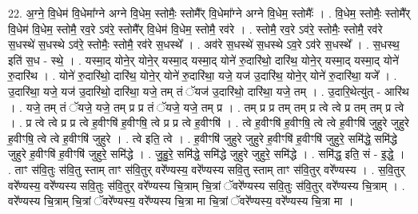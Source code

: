 \documentclass[17pt]{extarticle}
\begin{document}
22. अ॒ग्ने॒ वि॒धेम॑ वि॒धेमा᳚ग्ने अग्ने वि॒धेम॒ स्तोमैः॒ स्तोमै᳚र् वि॒धेमा᳚ग्ने अग्ने वि॒धेम॒ स्तोमैः᳚ । . वि॒धेम॒ स्तोमैः॒ स्तोमै᳚र् वि॒धेम॑ वि॒धेम॒ स्तोमै॒ रव॒रे ऽव॑रे॒ स्तोमै᳚र् वि॒धेम॑ वि॒धेम॒ स्तोमै॒ रव॑रे । . स्तोमै॒ रव॒रे ऽव॑रे॒ स्तोमैः॒ स्तोमै॒ रव॑रे स॒धस्थे॑ स॒धस्थे ऽव॑रे॒ स्तोमैः॒ स्तोमै॒ रव॑रे स॒धस्थे᳚ । . अव॑रे स॒धस्थे॑ स॒धस्थे ऽव॒रे ऽव॑रे स॒धस्थे᳚ । . स॒धस्थ॒ इति॑ स॒ध - स्थे॒ । . यस्मा॒द् योने॒र् योने॒र् यस्मा॒द् यस्मा॒द् योने॑ रु॒दारि॑थो॒ दारि॑थ॒ योने॒र् यस्मा॒द् यस्मा॒द् योने॑ रु॒दारि॑थ । . योने॑ रु॒दारि॑थो॒ दारि॑थ॒ योने॒र् योने॑ रु॒दारि॑था॒ यजे॒ यज॑ उ॒दारि॑थ॒ योने॒र् योने॑ रु॒दारि॑था॒ यजे᳚ । . उ॒दारि॑था॒ यजे॒ यज॑ उ॒दारि॑थो॒ दारि॑था॒ यजे॒ तम् तं ॅयज॑ उ॒दारि॑थो॒ दारि॑था॒ यजे॒ तम् । . उ॒दारि॒थेत्यु॑त् - आरि॑थ । . यजे॒ तम् तं ॅयजे॒ यजे॒ तम् प्र प्र तं ॅयजे॒ यजे॒ तम् प्र । . तम् प्र प्र तम् तम् प्र त्वे त्वे प्र तम् तम् प्र त्वे । . प्र त्वे त्वे प्र प्र त्वे ह॒वीꣳषि॑ ह॒वीꣳषि॒ त्वे प्र प्र त्वे ह॒वीꣳषि॑ । . त्वे ह॒वीꣳषि॑ ह॒वीꣳषि॒ त्वे त्वे ह॒वीꣳषि॑ जुहुरे जुहुरे ह॒वीꣳषि॒ त्वे त्वे ह॒वीꣳषि॑ जुहुरे । . त्वे इति॒ त्वे । . ह॒वीꣳषि॑ जुहुरे जुहुरे ह॒वीꣳषि॑ ह॒वीꣳषि॑ जुहुरे॒ समि॑द्धे॒ समि॑द्धे जुहुरे ह॒वीꣳषि॑ ह॒वीꣳषि॑ जुहुरे॒ समि॑द्धे । . जु॒हु॒रे॒ समि॑द्धे॒ समि॑द्धे जुहुरे जुहुरे॒ समि॑द्धे । . समि॑द्ध॒ इति॒ सं - इ॒द्धे॒ । . ताꣳ स॑वि॒तुः स॑वि॒तु स्ताम् ताꣳ स॑वि॒तुर् वरे᳚ण्यस्य॒ वरे᳚ण्यस्य सवि॒तु स्ताम् ताꣳ स॑वि॒तुर् वरे᳚ण्यस्य । . स॒वि॒तुर् वरे᳚ण्यस्य॒ वरे᳚ण्यस्य सवि॒तुः स॑वि॒तुर् वरे᳚ण्यस्य चि॒त्राम् चि॒त्रां ॅवरे᳚ण्यस्य सवि॒तुः स॑वि॒तुर् वरे᳚ण्यस्य चि॒त्राम् । . वरे᳚ण्यस्य चि॒त्राम् चि॒त्रां ॅवरे᳚ण्यस्य॒ वरे᳚ण्यस्य चि॒त्रा मा चि॒त्रां ॅवरे᳚ण्यस्य॒ वरे᳚ण्यस्य चि॒त्रा मा । \newline
\end{document}
